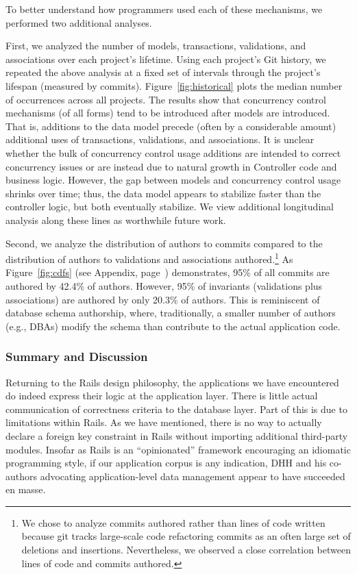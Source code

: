  To better understand how programmers
used each of these mechanisms, we performed two additional
analyses.

First, we analyzed the number of models, transactions, validations,
and associations over each project's lifetime. Using each project's
Git history, we repeated the above analysis at a fixed set of
intervals through the project's lifespan (measured by
commits). Figure~\ref{fig:historical} plots the median
number of occurrences across all projects. The results show that
concurrency control mechanisms (of all forms) tend to be introduced
after models are introduced. That is, additions to the data model
precede (often by a considerable amount) additional uses of
transactions, validations, and associations. It is unclear whether the
bulk of concurrency control usage additions are intended to correct
concurrency issues or are instead due to natural growth in Controller
code and business logic. However, the gap between models and
concurrency control usage shrinks over time; thus, the data model
appears to stabilize faster than the controller logic, but both
eventually stabilize. We view additional longitudinal analysis along
these lines as worthwhile future work.


Second, we analyze the distribution of authors to commits compared to
the distribution of authors to validations and associations
authored.\footnote{We chose to analyze commits authored rather than
  lines of code written because git tracks large-scale code
  refactoring commits as an often large set of deletions and
  insertions. Nevertheless, we observed a close correlation between
  lines of code and commits authored.} As Figure~\ref{fig:cdfs} (see
Appendix, page~\pageref{fig:cdfs}) demonstrates, 95\% of all commits
are authored by 42.4\% of authors. However, 95\% of invariants
(validations plus associations) are authored by only 20.3\% of
authors. This is reminiscent of database schema authorship, where,
traditionally, a smaller number of authors (e.g., DBAs) modify the
schema than contribute to the actual application code.


\FloatBarrier
\subsubsection{Summary and Discussion}

Returning to the Rails design philosophy, the applications we have
encountered do indeed express their logic at the application
layer. There is little actual communication of correctness criteria to
the database layer. Part of this is due to limitations within
Rails. As we have mentioned, there is no way to actually declare a
foreign key constraint in Rails without importing additional
third-party modules. Insofar as Rails is an ``opinionated'' framework
encouraging an idiomatic programming style, if our application corpus
is any indication, DHH and his co-authors advocating application-level
data management appear to have succeeded en masse.

